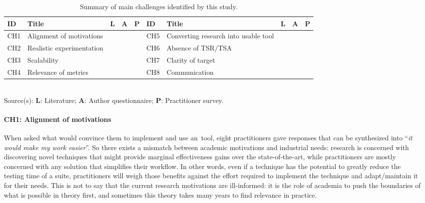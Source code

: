 \begin{table}[]
\scriptsize
{}
\setlength{\tabcolsep}{6pt}
\begin{tabular}{lllll|lllll}
\toprule
\textbf{ID} & \textbf{Title} & \textbf{L}  & \textbf{A} & \textbf{P} &
\textbf{ID} & \textbf{Title} & \textbf{L}  & \textbf{A} & \textbf{P}\\
\midrule
CH1 & Alignment of motivations             &   				&  			     & \fullcirc      &
CH5 & Converting research into usable tool &                & \fullcirc 	 & \fullcirc 	  \\

CH2 & Realistic experimentation            & \fullcirc 		&                &                &
CH6 & Absence of TSR/TSA                   & \fullcirc 		&                & \fullcirc 	  \\

CH3 & Scalability                          & \fullcirc 		&                &                &
CH7 & Clarity of target                    & \fullcirc 		&                &        	      \\

CH4 & Relevance of metrics                 & \fullcirc 		& \fullcirc 	 &                &
CH8 & Communication                        &                & \fullcirc 	 & \fullcirc 	  \\
\bottomrule
\end{tabular}\\
\scriptsize Source(s): \textbf{L}: Literature; \textbf{A}: Author questionnaire; \textbf{P}: Practitioner survey.
\caption{Summary of main challenges identified by this study.}
\label{table:challenges}
\end{table}


\paragraph{CH1: Alignment of motivations}
When asked what would convince them to implement and use an~\rt tool, eight practitioners gave responses that can be synthesized into ``\textit{it would make my work easier}''.
So there exists a mismatch between academic motivations and industrial needs: research is concerned with discovering novel techniques that might provide marginal effectiveness gains over the state-of-the-art, while practitioners are mostly concerned with any solution that simplifies their workflow.
In other words, even if a \tcs technique has the potential to greatly reduce the testing time of a suite, practitioners will weigh those benefits against the effort required to implement the technique and adapt/maintain it for their needs.
This is not to say that the current research motivations are ill-informed: it is the role of academia to push the boundaries of what is possible in theory first, and sometimes this theory takes many years to find relevance in practice.

